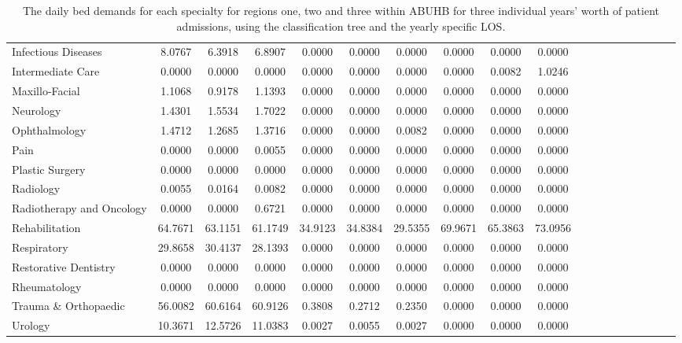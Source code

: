 \documentclass[thesis.tex]{subfiles}
\begin{document}
\begin{landscape}
\begin{table}[h!]
{\begin{tabular}{lcccccccccccccccccc}
Infectious Diseases&	8.0767&	6.3918&	6.8907&	0.0000&	0.0000&	0.0000&	0.0000&	0.0000&	0.0000\\
Intermediate Care&	0.0000&	0.0000&	0.0000&	0.0000&	0.0000&	0.0000&	0.0000&	0.0082&	1.0246\\
Maxillo-Facial&	1.1068&	0.9178&	1.1393&	0.0000&	0.0000&	0.0000&	0.0000&	0.0000&	0.0000\\
Neurology&	1.4301&	1.5534&	1.7022&	0.0000&	0.0000&	0.0000&	0.0000&	0.0000&	0.0000\\
Ophthalmology&	1.4712&	1.2685&	1.3716&	0.0000&	0.0000&	0.0082&	0.0000&	0.0000&	0.0000\\
Pain&	0.0000&	0.0000&	0.0055&	0.0000&	0.0000&	0.0000&	0.0000&	0.0000&	0.0000\\
Plastic Surgery&	0.0000&	0.0000&	0.0000&	0.0000&	0.0000&	0.0000&	0.0000&	0.0000&	0.0000\\
Radiology&	0.0055&	0.0164&	0.0082&	0.0000&	0.0000&	0.0000&	0.0000&	0.0000&	0.0000\\
Radiotherapy and Oncology&	0.0000&	0.0000&	0.6721&	0.0000&	0.0000&	0.0000&	0.0000&	0.0000&	0.0000\\
Rehabilitation&	64.7671&	63.1151&	61.1749&	34.9123&	34.8384&	29.5355&	69.9671&	65.3863&	73.0956\\
Respiratory&	29.8658&	30.4137&	28.1393&	0.0000&	0.0000&	0.0000&	0.0000&	0.0000&	0.0000\\
Restorative Dentistry&	0.0000&	0.0000&	0.0000&	0.0000&	0.0000&	0.0000&	0.0000&	0.0000&	0.0000\\
Rheumatology&	0.0000&	0.0000&	0.0000&	0.0000&	0.0000&	0.0000&	0.0000&	0.0000&	0.0000\\
Trauma \& Orthopaedic&	56.0082&	60.6164&	60.9126&	0.3808&	0.2712&	0.2350&	0.0000&	0.0000&	0.0000\\
Urology&	10.3671&	12.5726&	11.0383&	0.0027&	0.0055&	0.0027&	0.0000&	0.0000&	0.0000\\

\bottomrule
\end{tabular}  } 
\caption{The daily bed demands for each specialty for regions one, two and three within ABUHB for three individual years’ worth of patient admissions, using the classification tree and the yearly specific LOS.}
    \label{apptab:LinkedDemands10a}
\end{table}  



\end{landscape}
\end{document}
